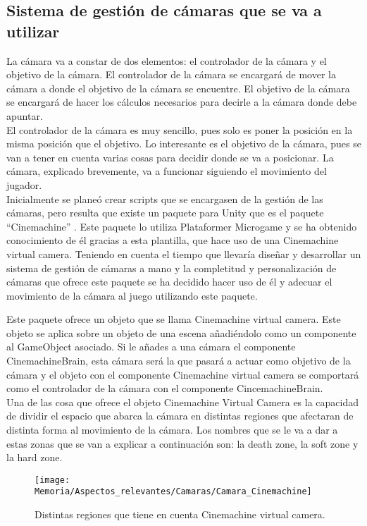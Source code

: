 \subsection{Sistema de gestión de cámaras que se va a utilizar}
La cámara va a constar de dos elementos: el controlador de la cámara y el objetivo de la cámara. El controlador de la cámara se encargará de mover la cámara a donde el objetivo de la cámara se encuentre. El objetivo de la cámara se encargará de hacer los cálculos necesarios para decirle a la cámara donde debe apuntar.\\
El controlador de la cámara es muy sencillo, pues solo es poner la posición en la misma posición que el objetivo. Lo interesante es el objetivo de la cámara, pues se van a tener en cuenta varias cosas para decidir donde se va a posicionar. La cámara, explicado brevemente, va a funcionar siguiendo el movimiento del jugador.\\
Inicialmente se planeó crear scripts que se encargasen de la gestión de las cámaras, pero resulta que existe un paquete para Unity que es el paquete “Cinemachine” \cite{PaqueteCinemachine}. Este paquete lo utiliza Plataformer Microgame y se ha obtenido conocimiento de él gracias a esta plantilla, que hace uso de una Cinemachine virtual camera. Teniendo en cuenta el tiempo que llevaría diseñar y desarrollar un sistema de gestión de cámaras a mano y la completitud y personalización de cámaras que ofrece este paquete se ha decidido hacer uso de él y adecuar el movimiento de la cámara al juego utilizando este paquete.

Este paquete ofrece un objeto que se llama Cinemachine virtual camera. Este objeto se aplica sobre un objeto de una escena añadiéndolo como un componente al GameObject asociado. Si le añades a una cámara el componente CinemachineBrain, esta cámara será la que pasará a actuar como objetivo de la cámara y el objeto con el componente Cinemachine virtual camera se comportará como el controlador de la cámara con el componente CincemachineBrain.\\
Una de las cosa que ofrece el objeto Cinemachine Virtual Camera es la capacidad de dividir el espacio que abarca la cámara en distintas regiones que afectaran de distinta forma al movimiento de la cámara. Los nombres que se le va a dar a estas zonas que se van a explicar a continuación son: la death zone, la soft zone y la hard zone. 

\clearpage
\begin{figure}[h]
\texttt{[image: Memoria/Aspectos\_relevantes/Camaras/Camara\_Cinemachine]}
\caption{Distintas regiones que tiene en cuenta Cinemachine virtual camera.}
\end{figure}


